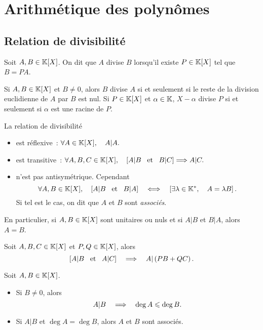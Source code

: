 \documentclass{magnolia}
\begin{document}
\magtoc


\section{Arithmétique des polynômes}

\subsection{Relation de divisibilité}

\begin{definition}
Soit $A,B\in\polyK$. On dit que $A$ divise $B$ lorsqu'il existe $P\in\polyK$ tel
que $B=PA$.  
\end{definition}

\begin{remarques}
\remarque Si $A,B\in\polyK$ et $B\neq 0$, alors $B$ divise $A$ si et seulement
    si le reste de la division euclidienne de $A$ par $B$ est nul.
\remarque Si $P\in\polyK$ et $\alpha\in\mathbb{K}$, $X-\alpha$ divise $P$ si et
  seulement si $\alpha$ est une racine de $P$.
\end{remarques}

\begin{proposition}
La relation de divisibilité
\begin{itemize}
\item est réflexive~: $\forall A\in\polyK \qsep A|A.$
\item est transitive~: $\forall A,B,C\in\polyK \qsep \cro{A|B \et B|C}\implique
      A|C.$
\item n'est pas antisymétrique. Cependant
  \[\forall A,B\in\polyK \qsep \cro{A|B \et B|A}\quad\ssi\quad
    \cro{\exists \lambda\in\Ks \qsep A=\lambda B}.\]
  Si tel est le cas, on dit que $A$ et $B$ sont \emph{associés}.
\end{itemize}
\end{proposition}

\begin{remarqueUnique}
\remarque En particulier, si $A,B\in\polyK$ sont unitaires ou nuls et si $A|B$ et $B|A$,
  alors $A=B$.
\end{remarqueUnique}

\begin{proposition}
Soit $A,B,C\in\polyK$ et $P,Q\in\polyK$, alors
\[\left[A|B \quad\!\text{et}\quad\! A|C\right]\quad\Longrightarrow\quad A|\left(PB+QC\right).\]
\end{proposition}

\begin{proposition}
Soit $A,B\in\polyK$.
\begin{itemize}
\item Si $B\neq 0$, alors
  \[A|B \quad\Longrightarrow\quad \deg A\leqslant\deg B.\]
\item Si $A|B$ et $\deg A=\deg B$, alors $A$ et $B$ sont associés.
\end{itemize}
\end{proposition}
\end{document}
